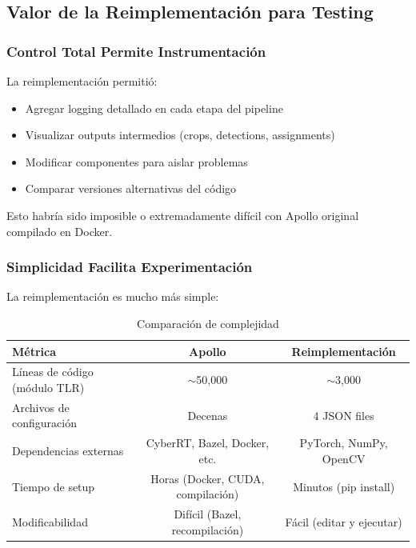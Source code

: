 \subsection{Valor de la Reimplementación para Testing}

\subsubsection{Control Total Permite Instrumentación}

La reimplementación permitió:

\begin{itemize}
    \item Agregar logging detallado en cada etapa del pipeline
    \item Visualizar outputs intermedios (crops, detections, assignments)
    \item Modificar componentes para aislar problemas
    \item Comparar versiones alternativas del código
\end{itemize}

Esto habría sido imposible o extremadamente difícil con Apollo original compilado en Docker.

\subsubsection{Simplicidad Facilita Experimentación}

La reimplementación es mucho más simple:

\begin{table}[H]
\centering
\begin{tabular}{|l|c|c|}
\hline
\textbf{Métrica} & \textbf{Apollo} & \textbf{Reimplementación} \\
\hline
Líneas de código (módulo TLR) & $\sim$50,000 & $\sim$3,000 \\
\hline
Archivos de configuración & Decenas & 4 JSON files \\
\hline
Dependencias externas & CyberRT, Bazel, Docker, etc. & PyTorch, NumPy, OpenCV \\
\hline
Tiempo de setup & Horas (Docker, CUDA, compilación) & Minutos (pip install) \\
\hline
Modificabilidad & Difícil (Bazel, recompilación) & Fácil (editar y ejecutar) \\
\hline
\end{tabular}
\caption{Comparación de complejidad}
\end{table}

